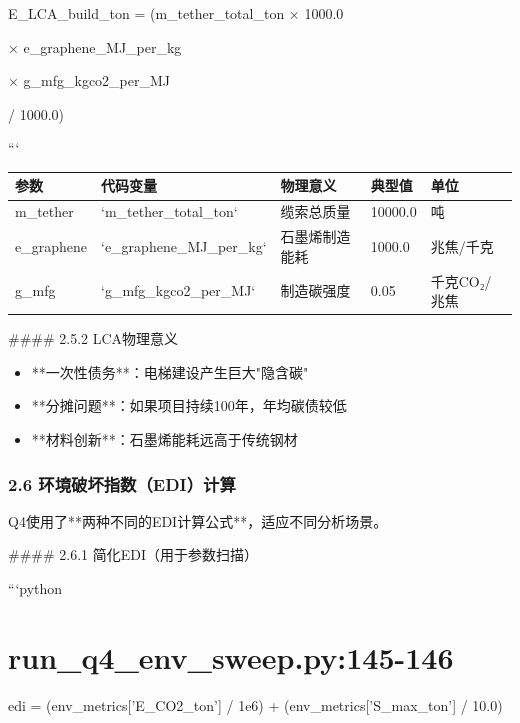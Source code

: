 \documentclass[a4paper,12pt]{article}
\begin{document}
\par
E\_LCA\_build\_ton = (m\_tether\_total\_ton × 1000.0

\par
× e\_graphene\_MJ\_per\_kg

\par
× g\_mfg\_kgco2\_per\_MJ

\par
/ 1000.0)

\par
```

\par
\begin{center}
\begin{longtable}{|l|l|l|l|l|}
\hline
参数 & 代码变量 & 物理意义 & 典型值 & 单位 \\ \hline
m_tether & `m_tether_total_ton` & 缆索总质量 & 10000.0 & 吨 \\ \hline
e_graphene & `e_graphene_MJ_per_kg` & 石墨烯制造能耗 & 1000.0 & 兆焦/千克 \\ \hline
g_mfg & `g_mfg_kgco2_per_MJ` & 制造碳强度 & 0.05 & 千克CO₂/兆焦 \\ \hline
\end{longtable}
\end{center}
#### 2.5.2 LCA物理意义

\par
\begin{itemize}
\item **一次性债务**：电梯建设产生巨大"隐含碳"
\end{itemize}
\begin{itemize}
\item **分摊问题**：如果项目持续100年，年均碳债较低
\end{itemize}
\begin{itemize}
\item **材料创新**：石墨烯能耗远高于传统钢材
\end{itemize}
\subsubsection{2.6 环境破坏指数（EDI）计算}
Q4使用了**两种不同的EDI计算公式**，适应不同分析场景。

\par
#### 2.6.1 简化EDI（用于参数扫描）

\par
```python

\par
\section{run_q4_env_sweep.py:145-146}
edi = (env\_metrics['E\_CO2\_ton'] / 1e6) + (env\_metrics['S\_max\_ton'] / 10.0)
\end{document}
